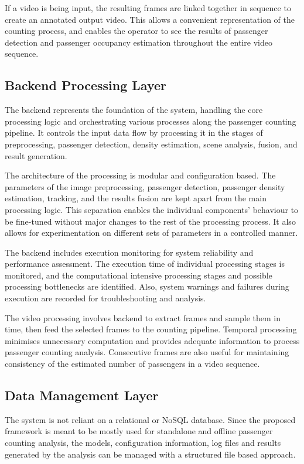 If a video is being input, the resulting frames are linked together in sequence to create an annotated output video. This allows a convenient representation of the counting process, and enables the operator to see the results of passenger detection and passenger occupancy estimation throughout the entire video sequence.

\subsection{Backend Processing Layer}

The backend represents the foundation of the system, handling the core processing logic and orchestrating various processes along the passenger counting pipeline. It controls the input data flow by processing it in the stages of preprocessing, passenger detection, density estimation, scene analysis, fusion, and result generation.

The architecture of the processing is modular and configuration based. The parameters of the image preprocessing, passenger detection, passenger density estimation, tracking, and the results fusion are kept apart from the main processing logic. This separation enables the individual components' behaviour to be fine-tuned without major changes to the rest of the processing process. It also allows for experimentation on different sets of parameters in a controlled manner.

The backend includes execution monitoring for system reliability and performance assessment. The execution time of individual processing stages is monitored, and the computational intensive processing stages and possible processing bottlenecks are identified. Also, system warnings and failures during execution are recorded for troubleshooting and analysis.

The video processing involves backend to extract frames and sample them in time, then feed the selected frames to the counting pipeline. Temporal processing minimises unnecessary computation and provides adequate information to process passenger counting analysis. Consecutive frames are also useful for maintaining consistency of the estimated number of passengers in a video sequence.

\subsection{Data Management Layer}

The system is not reliant on a relational or NoSQL database. Since the proposed framework is meant to be mostly used for standalone and offline passenger counting analysis, the models, configuration information, log files and results generated by the analysis can be managed with a structured file based approach.

